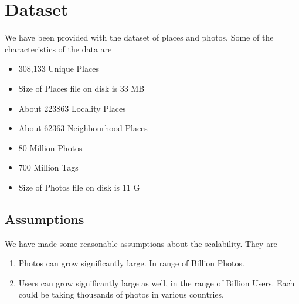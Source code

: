 \chapter{Dataset}

	We have been provided with the dataset of places and photos. Some of the characteristics of the data are
	\begin{itemize}
	\item 308,133 Unique Places
	\item Size of Places file on disk is 33 MB 
	\item About 223863 Locality Places
	\item About 62363 Neighbourhood Places
	\item 80 Million Photos
	\item 700 Million Tags
	\item Size of Photos file on disk is 11 G
	\end{itemize}
	
\section{Assumptions}
	
	We have made some reasonable assumptions about the scalability. They are
	\begin{enumerate}
	\item Photos can grow significantly large. In range of Billion Photos.
	\item Users can grow significantly large as well, in the range of Billion Users. Each could be taking thousands of photos in various countries.  
	\end{enumerate}

	

